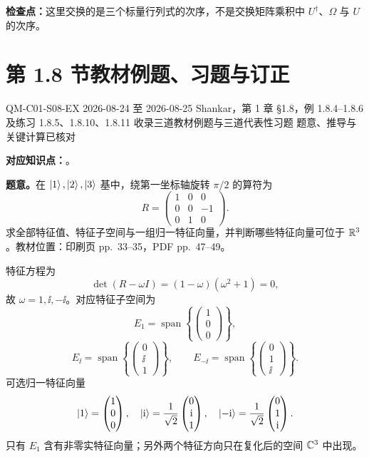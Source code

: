 \textbf{检查点：}这里交换的是三个标量行列式的次序，不是交换矩阵乘积中 $U^\dagger$、$\Omega$ 与 $U$ 的次序。

\section{第 1.8 节教材例题、习题与订正}
\label{exercise-set:QM-C01-S08}

\exercisemeta
  {QM-C01-S08-EX}
  {2026-08-24 至 2026-08-25}
  {Shankar，第 1 章 \S 1.8，例 1.8.4--1.8.6 及练习 1.8.5、1.8.10、1.8.11}
  {收录三道教材例题与三道代表性习题}
  {题意、推导与关键计算已核对}


\textbf{对应知识点：}。

\textbf{题意。}在 $\left|1\right\rangle,\left|2\right\rangle,\left|3\right\rangle$ 基中，绕第一坐标轴旋转 $\pi/2$ 的算符为
\[
  R=
  \begin{pmatrix}
    1&0&0\\
    0&0&-1\\
    0&1&0
  \end{pmatrix}.
\]
求全部特征值、特征子空间与一组归一特征向量，并判断哪些特征向量可位于 $\mathbb{R}^3$。教材位置：印刷页 pp.~33--35，PDF pp.~47--49。

\begin{checkedsolution}
特征方程为
\[
  \det(R-\omega I)=(1-\omega)(\omega^2+1)=0,
\]
故 $\omega=1,\ii,-\ii$。对应特征子空间为
\[
  E_1=\operatorname{span}\left\{
    \begin{pmatrix}1\\0\\0\end{pmatrix}
  \right\},
\]
\[
  E_{\ii}=\operatorname{span}\left\{
    \begin{pmatrix}0\\\ii\\1\end{pmatrix}
  \right\},
  \qquad
  E_{-\ii}=\operatorname{span}\left\{
    \begin{pmatrix}0\\1\\\ii\end{pmatrix}
  \right\}.
\]
可选归一特征向量
\[
  \left|1\right\rangle=\begin{pmatrix}1\\0\\0\end{pmatrix},
  \quad
  \left|\mathrm{i}\right\rangle=\frac1{\sqrt2}\begin{pmatrix}0\\\mathrm{i}\\1\end{pmatrix},
  \quad
  \left|-\mathrm{i}\right\rangle=\frac1{\sqrt2}\begin{pmatrix}0\\1\\\mathrm{i}\end{pmatrix}.
\]
只有 $E_1$ 含有非零实特征向量；另外两个特征方向只在复化后的空间 $\mathbb{C}^3$ 中出现。
\end{checkedsolution}

